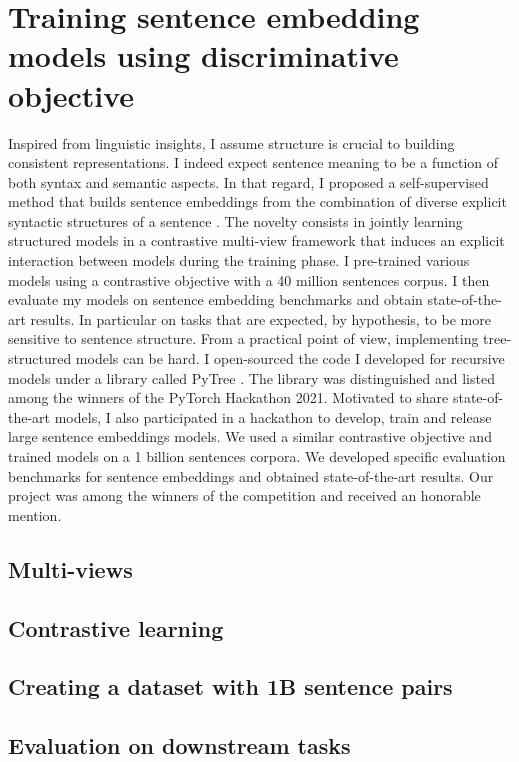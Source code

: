 \chapter{Training sentence embedding models using discriminative objective}

Inspired from linguistic insights, I assume structure is crucial to building consistent representations. I indeed expect sentence meaning to be a function of both syntax and semantic aspects. In that regard, I proposed a self-supervised method that builds sentence embeddings from the combination of diverse explicit syntactic structures of a sentence \parencite{simoulin_2021a}. The novelty consists in jointly learning structured models in a contrastive multi-view framework that induces an explicit interaction between models during the training phase. I pre-trained various models using a contrastive objective with a 40 million sentences corpus. I then evaluate my models on sentence embedding benchmarks and obtain state-of-the-art results. In particular on tasks that are expected, by hypothesis, to be more sensitive to sentence structure. From a practical point of view, implementing tree-structured models can be hard. I open-sourced the code I developed for recursive models under a library called PyTree . The library was distinguished and listed among the winners of the PyTorch Hackathon 2021. Motivated to share state-of-the-art models, I also participated in a hackathon  to develop, train and release large sentence embeddings models. We used a similar contrastive objective and trained models on a 1 billion sentences corpora. We developed specific evaluation benchmarks for sentence embeddings and obtained state-of-the-art results. Our project was among the winners of the competition and received an honorable mention.

\section{Multi-views}

\section{Contrastive learning}

\section{Creating a dataset with 1B sentence pairs}

\section{Evaluation on downstream tasks}

